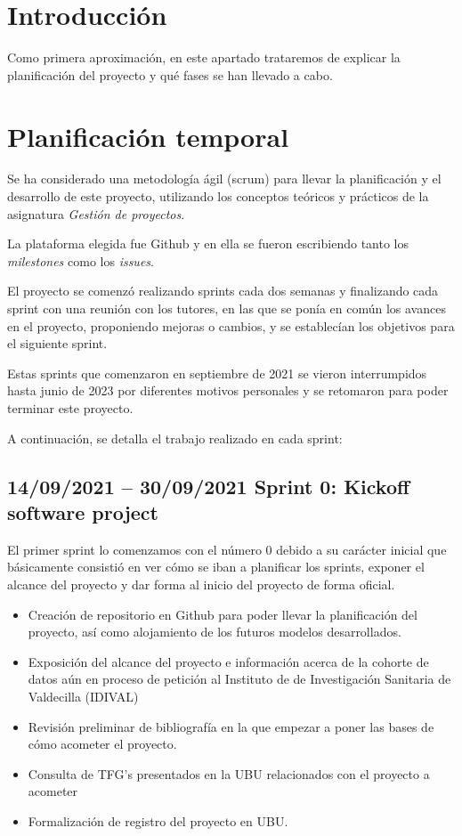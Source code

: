 
\section{Introducción}

Como primera aproximación, en este apartado trataremos de explicar la planificación del proyecto y qué fases se han llevado a cabo.

\section{Planificación temporal}

Se ha considerado una metodología ágil (scrum) para llevar la planificación y el desarrollo de este proyecto, utilizando los conceptos teóricos y prácticos de la asignatura \textit{Gestión de proyectos}.

La plataforma elegida fue Github y en ella se fueron escribiendo tanto los \textit{milestones} como los \textit{issues}.

El proyecto se comenzó realizando sprints cada dos semanas y finalizando cada sprint con una reunión con los tutores, en las que se ponía en común los avances en el proyecto, proponiendo mejoras o cambios, y se establecían los objetivos para el siguiente sprint.

Estas sprints que comenzaron en septiembre de 2021 se vieron interrumpidos hasta junio de 2023 por diferentes motivos personales y se retomaron para poder terminar este proyecto.

A continuación, se detalla el trabajo realizado en cada sprint:

\subsection{14/09/2021 – 30/09/2021 \newline Sprint 0: Kickoff software project}

El primer sprint lo comenzamos con el número 0 debido a su carácter inicial que básicamente consistió en ver cómo se iban a planificar los sprints, exponer el alcance del proyecto y dar forma al inicio del proyecto de forma oficial.

\begin{itemize}
    \item Creación de repositorio en Github para poder llevar la planificación del proyecto, así como alojamiento de los futuros modelos desarrollados.
    \item Exposición del alcance del proyecto e información acerca de la cohorte de datos aún en proceso de petición al Instituto de de Investigación Sanitaria de Valdecilla (IDIVAL)
    \item Revisión preliminar de bibliografía en la que empezar a poner las bases de cómo acometer el proyecto.
    \item Consulta de TFG's presentados en la UBU relacionados con el proyecto a acometer  
    \item Formalización de registro del proyecto en UBU.
\end{itemize}


